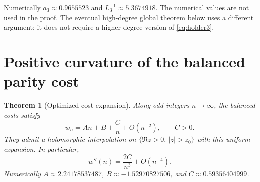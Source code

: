 \documentclass[11pt]{article}
\newtheorem{theorem}{Theorem}
\theoremstyle{remark}\newtheorem{remark}[theorem]{Remark}
\begin{document}
Numerically $a_3\approx0.9655523$ and $L_3^{-1}\approx5.3674918$.
The numerical values are not used in the proof. The eventual
high-degree global theorem below uses a different argument; it does
not require a higher-degree version of \eqref{eq:holder3}.

\section{Positive curvature of the balanced parity cost}

\begin{theorem}[Optimized cost expansion]\label{thm:curvature}
Along odd integers $n\to\infty$, the balanced costs satisfy
\begin{equation}\label{eq:cost-asymptotic}
 w_n=An+B+\frac Cn+O(n^{-2}),\qquad C>0.
\end{equation}
They admit a holomorphic interpolation on
$\{\Re z>0,\ |z|>z_0\}$ with this uniform expansion. In particular,
\[
 w''(n)=\frac{2C}{n^3}+O(n^{-4}).
\]
Numerically $A\approx2.24178537487$, $B\approx-1.52970827506$, and
$C\approx0.59356404999$.
\end{theorem}
\end{document}
